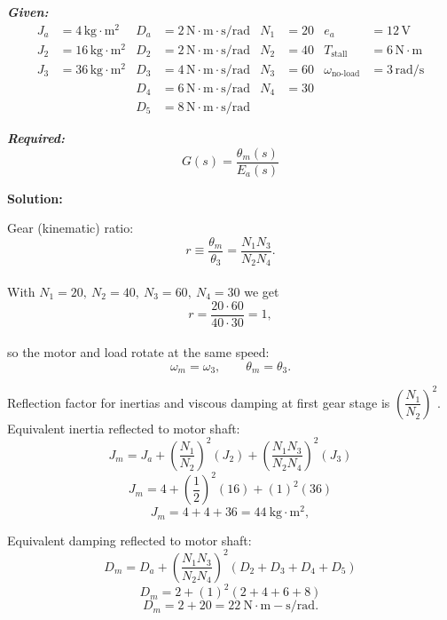 \documentclass[11pt]{article}
\begin{document}
\vspace{12pt}

\noindent\textbf{\textit{Given:}}
\[
\begin{aligned}
J_a &= 4\, \text{kg}\cdot\text{m}^2 & D_a &= 2\, \text{N}\cdot\text{m}\cdot\text{s/rad} & N_1 &= 20 & e_a &= 12\,\text{V} \\
J_2 &= 16\, \text{kg}\cdot\text{m}^2 & D_2 &= 2\, \text{N}\cdot\text{m}\cdot\text{s/rad} & N_2 &= 40 & T_{\text{stall}} &= 6\,\text{N}\cdot\text{m} \\
J_3 &= 36\, \text{kg}\cdot\text{m}^2 & D_3 &= 4\, \text{N}\cdot\text{m}\cdot\text{s/rad} & N_3 &= 60 & \omega_{\text{no-load}} &= 3\,\text{rad/s} \\
& & D_4 &= 6\, \text{N}\cdot\text{m}\cdot\text{s/rad} & N_4 &= 30 & & \\
& & D_5 &= 8\, \text{N}\cdot\text{m}\cdot\text{s/rad} & & & &
\end{aligned}
\]

\vspace{12pt}

\noindent \textbf{\textit{Required:}}
\[
G(s) = \frac{\theta_m(s)}{E_a(s)}
\]

\vspace{12pt}

\noindent \textbf{Solution:}

Gear (kinematic) ratio:
\[
r \equiv \frac{\theta_m}{\theta_3}=\frac{N_1 N_3}{N_2 N_4}.
\]  \\

With \(N_1=20,\ N_2=40,\ N_3=60,\ N_4=30\) we get
\[
r=\frac{20 \cdot 60}{40 \cdot 30}=1,
\] \\

so the motor and load rotate at the same speed:
\[
\omega_m = \omega_3,\qquad \theta_m = \theta_3.
\]

Reflection factor for inertias and viscous damping at first gear stage is \(\left(\dfrac{N_1}{N_2}\right)^2\). \\

Equivalent inertia reflected to motor shaft:
\[
J_m = J_a + \left(\frac{N_1}{N_2}\right)^2 (J_2) + \left(\frac{N_1 N_3}{N_2 N_4}\right)^2 (J_3)
\]
\[
J_m = 4 + \left(\frac{1}{2}\right)^2 (16) + (1)^2 (36)
\]
\[
J_m = 4 + 4 + 36 = 44\ \mathrm{kg\cdot m^2},
\]

Equivalent damping reflected to motor shaft:
\[
D_m = D_a + \left(\frac{N_1 N_3}{N_2 N_4}\right)^2 (D_2 + D_3 + D_4 + D_5)
\]
\[
D_m = 2 + (1)^2 (2 + 4 + 6 + 8)
\]
\[
D_m = 2 + 20 = 22\ \mathrm{N\cdot m\!-\!s/rad}.
\]
\end{document}

